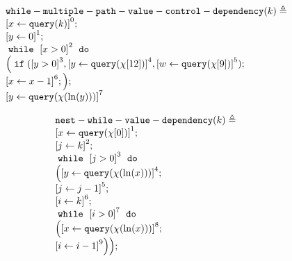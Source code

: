             \begin{example}
                \[
                    \begin{array}{l}
                    \kw{while-multiple-path-value-control-dependency}(k) \triangleq\\
                        \clabel{ \assign{x}{\query(k)}}^{0} ; \\
                        \clabel{\assign{y}{0} }^{1} ; \\
                            \ewhile ~ \clabel{x > 0}^{2} ~ \edo ~ \\
                            \Big(
                             \eif(\clabel{y > 0}^{3}, 
                             \clabel{\assign{y}{\query(\chi[12])}}^{4}, 
                             \clabel{\assign{w}{\query(\chi[9])}}^{5});                            
                             \\
                             \clabel{\assign{x}{x-1}}^{6} ;\Big);\\
                             \clabel{\assign{y}{\query(\chi(\ln(y)))} }^{7} 
                        \end{array}
                    \]
                \end{example}
                \begin{example}
                    \[
                    \begin{array}{l}
                    \kw{nest-while-value-dependency}(k) \triangleq \\
                        \clabel{ \assign{x}{\query(\chi[0])}}^{1} ; \\
                        \clabel{\assign{j}{k} }^{2} ; \\
                            \ewhile ~ \clabel{j > 0}^{3} ~ \edo ~ \\
                            \Big(
                             \clabel{\assign{y}{\query(\chi(\ln(x)))} }^{4}  ; \\
                             \clabel{\assign{j}{j-1}}^{5} ;\\
                             \clabel{\assign{i}{k}}^{6} ;\\
                             \ewhile ~ \clabel{i > 0}^{7} ~ \edo ~ \\
                             \Big(
                              \clabel{\assign{x}{\query(\chi(\ln(x)))} }^{8}  ; \\
                              \clabel{\assign{i}{i-1}}^{9}
                              \Big) \Big);
                        \end{array}
                    \]
                    \end{example}

